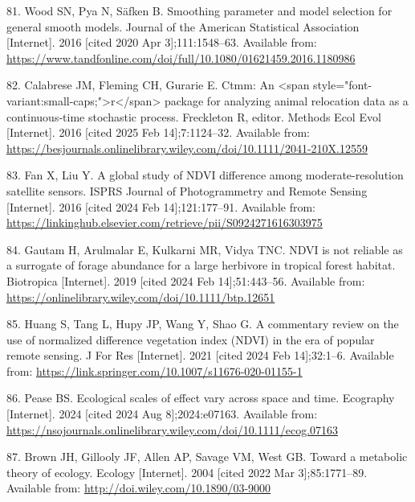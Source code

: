 \documentclass[
  12pt,
]{article}
\newlength{\cslhangindent}
\newenvironment{CSLReferences}[2] %
 {\begin{list}{}{%
  \setlength{\itemindent}{0pt}
  \setlength{\leftmargin}{0pt}
  \setlength{\parsep}{0pt}
  \ifodd #1
   \setlength{\leftmargin}{\cslhangindent}
   \setlength{\itemindent}{-1\cslhangindent}
  \fi
  \setlength{\itemsep}{#2\baselineskip}}}
 {\end{list}}
\begin{document}
\begin{CSLReferences}{0}{1}
81. Wood SN, Pya N, Säfken B. Smoothing parameter and model selection for general smooth models. Journal of the American Statistical Association {[}Internet{]}. 2016 {[}cited 2020 Apr 3{]};111:1548--63. Available from: \url{https://www.tandfonline.com/doi/full/10.1080/01621459.2016.1180986}

82. Calabrese JM, Fleming CH, Gurarie E. Ctmm: An {\textless{}}span style="font-variant:small-caps;"{\textgreater{}}r{\textless{}}/span{\textgreater{}} package for analyzing animal relocation data as a continuous‐time stochastic process. Freckleton R, editor. Methods Ecol Evol {[}Internet{]}. 2016 {[}cited 2025 Feb 14{]};7:1124--32. Available from: \url{https://besjournals.onlinelibrary.wiley.com/doi/10.1111/2041-210X.12559}

83. Fan X, Liu Y. A global study of {NDVI} difference among moderate-resolution satellite sensors. {ISPRS} Journal of Photogrammetry and Remote Sensing {[}Internet{]}. 2016 {[}cited 2024 Feb 14{]};121:177--91. Available from: \url{https://linkinghub.elsevier.com/retrieve/pii/S0924271616303975}

84. Gautam H, Arulmalar E, Kulkarni MR, Vidya TNC. {NDVI} is not reliable as a surrogate of forage abundance for a large herbivore in tropical forest habitat. Biotropica {[}Internet{]}. 2019 {[}cited 2024 Feb 14{]};51:443--56. Available from: \url{https://onlinelibrary.wiley.com/doi/10.1111/btp.12651}

85. Huang S, Tang L, Hupy JP, Wang Y, Shao G. A commentary review on the use of normalized difference vegetation index ({NDVI}) in the era of popular remote sensing. J For Res {[}Internet{]}. 2021 {[}cited 2024 Feb 14{]};32:1--6. Available from: \url{https://link.springer.com/10.1007/s11676-020-01155-1}

86. Pease BS. Ecological scales of effect vary across space and time. Ecography {[}Internet{]}. 2024 {[}cited 2024 Aug 8{]};2024:e07163. Available from: \url{https://nsojournals.onlinelibrary.wiley.com/doi/10.1111/ecog.07163}

87. Brown JH, Gillooly JF, Allen AP, Savage VM, West GB. Toward a metabolic theory of ecology. Ecology {[}Internet{]}. 2004 {[}cited 2022 Mar 3{]};85:1771--89. Available from: \url{http://doi.wiley.com/10.1890/03-9000}


\end{CSLReferences}
\end{document}
